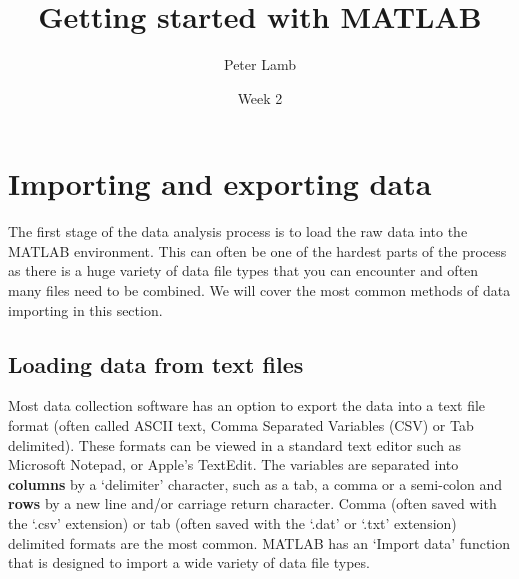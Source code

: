 \documentclass[12pt,a4paper]{article}
\title{Getting started with MATLAB}
\author{Peter Lamb}
\date{Week 2}
\begin{document}
\maketitle

\section{Importing and exporting data}
The first stage of the data analysis process is to load the raw data into the MATLAB environment.  
This can often be one of the hardest parts of the process as there is a huge variety of data file types that you can encounter and often many files need to be combined.  
We will cover the most common methods of data importing in this section.

\subsection{Loading data from text files}
Most data collection software has an option to export the data into a text file format (often called ASCII text, Comma Separated Variables (CSV) or Tab delimited).  
These formats can be viewed in a standard text editor such as Microsoft Notepad, or Apple's TextEdit.  
The variables are separated into \textbf{columns} by a `delimiter' character, such as a tab, a comma or a semi-colon and \textbf{rows} by a new line and/or carriage return character. 
Comma (often saved with the `.csv' extension) or tab (often saved with the `.dat' or `.txt' extension) delimited formats are the most common.  
MATLAB has an `Import data' function that is designed to import a wide variety of data file types.
\end{document}
